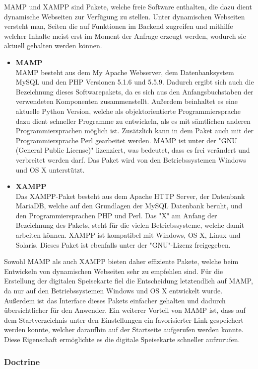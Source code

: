 {MAMP\cite{mamp}} und {XAMPP\cite{xampp}} sind Pakete, welche freie Software enthalten, die dazu dient dynamische Webseiten zur Verfügung zu stellen. Unter dynamischen Webseiten versteht man, Seiten die auf Funktionen im Backend zugreifen und mithilfe welcher Inhalte meist erst im Moment der Anfrage erzeugt werden, wodurch sie aktuell gehalten werden können.
\begin{itemize}
    \item \textbf{MAMP}\\
MAMP besteht aus dem My Apache Webserver, dem Datenbanksystem MySQL und den PHP Versionen 5.1.6 und 5.5.9. Dadurch ergibt sich auch die Bezeichnung dieses Softwarepakets, da es sich aus den Anfangsbuchstaben der verwendeten Komponenten zusammenstellt. Außerdem beinhaltet es eine aktuelle {Python\cite{python}} Version, welche als objektorientierte Programmiersprache dazu dient schneller Programme zu entwickeln, als es mit sämtlichen anderen Programmiersprachen möglich ist. Zusätzlich kann in dem Paket auch mit der Programmiersprache Perl gearbeitet werden. MAMP ist unter der "{GNU\cite{gnu}} (General Public License)" lizenziert, was bedeutet, dass es frei verändert und verbreitet werden darf. Das Paket wird von den Betriebssystemen Windows und OS X unterstützt. 
\pagebreak
    \item \textbf{XAMPP}\\ 
Das XAMPP-Paket besteht aus dem Apache HTTP Server, der Datenbank MariaDB, welche auf den Grundlagen der MySQL Datenbank beruht, und den Programmiersprachen PHP und Perl. Das "X" am Anfang der Bezeichnung des Pakets, steht für die vielen Betriebssysteme, welche damit arbeiten können. XAMPP ist kompatibel mit Windows, OS X, Linux und Solaris. Dieses Paket ist ebenfalls unter der "GNU"-Lizenz freigegeben.
  \end{itemize}  
Sowohl MAMP als auch XAMPP bieten daher effiziente Pakete, welche beim Entwickeln von dynamischen Webseiten sehr zu empfehlen sind. Für die Erstellung der digitalen Speisekarte fiel die Entscheidung letztendlich auf MAMP, da nur auf den Betriebssystemen Windows und OS X entwickelt wurde. Außerdem ist das Interface dieses Pakets einfacher gehalten und dadurch übersichtlicher für den Anwender. Ein weiterer Vorteil von MAMP ist, dass auf dem Startverzeichnis unter den Einstellungen ein favorisierter Link gespeichert werden konnte, welcher daraufhin auf der Startseite aufgerufen werden konnte. Diese Eigenschaft ermöglichte es die digitale Speisekarte schneller aufzurufen.

    \subsubsection{Doctrine}


